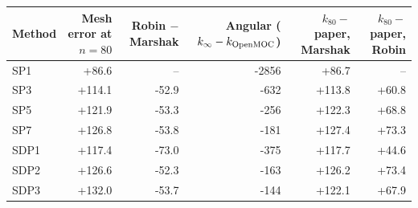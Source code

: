\begin{tabular}{lrrrrr}
\hline
Method & Mesh error at $n=80$ & Robin $-$ Marshak & Angular ($k_\infty - k_{\rm OpenMOC}$) & $k_{80} -$ paper, Marshak & $k_{80} -$ paper, Robin \\
\hline
SP1 & +86.6 & -- & -2856 & +86.7 & -- \\
SP3 & +114.1 & -52.9 & -632 & +113.8 & +60.8 \\
SP5 & +121.9 & -53.3 & -256 & +122.3 & +68.8 \\
SP7 & +126.8 & -53.8 & -181 & +127.4 & +73.3 \\
SDP1 & +117.4 & -73.0 & -375 & +117.7 & +44.6 \\
SDP2 & +126.6 & -52.3 & -163 & +126.2 & +73.4 \\
SDP3 & +132.0 & -53.7 & -144 & +122.1 & +67.9 \\
\hline
\end{tabular}

